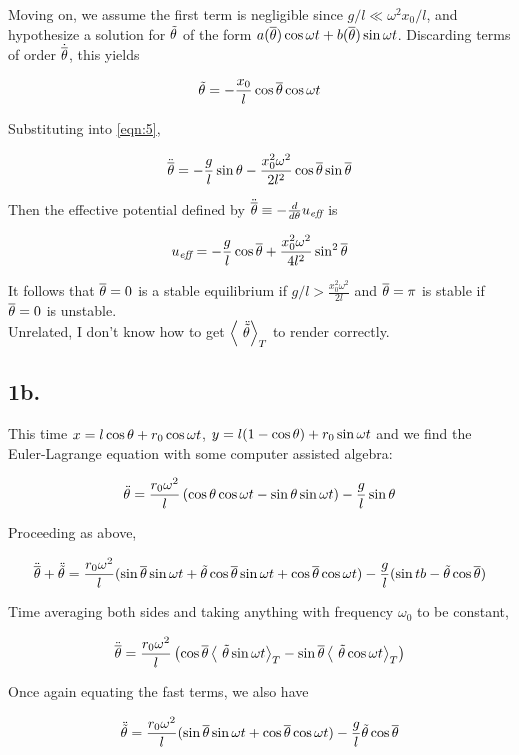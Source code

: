 \documentclass[12pt]{article}
\begin{document}
Moving on, we assume the first term is negligible since \(g/l \ll \omega^2x_0/l\), and hypothesize a solution for \(\tilde{\theta}\) of the form \(a(\overline{\theta})\cos\omega t + b(\overline{\theta})\sin\omega t\). Discarding terms of order \(\dot{\overline{\theta}}\), this yields

\[\tilde{\theta} = -\frac{x_0}{l}\cos\overline{\theta} \cos\omega t
\]

Substituting into \ref{eqn:5},

\begin{align*}
\ddot{\overline{\theta}} = -\frac{g}{l}\sin\theta - \frac{x_0^2\omega^2}{2l^2}\cos\overline{\theta}\sin\overline{\theta}
\end{align*}

Then the effective potential defined by \(\ddot{\overline{\theta}} \equiv -\frac{d}{d\theta}u_{\textit{eff}} \) is

\[u_{\textit{eff}} = -\frac{g}{l}\cos\overline{\theta} + \frac{x_0^2 \omega^2}{4l^2}\sin^2 \overline{\theta}
\]

It follows that \(\overline{\theta} = 0\) is a stable equilibrium if \(g/l > \frac{x_0^2\omega^2}{2l}\) and \(\overline{\theta}=\pi\) is stable if \(\overline{\theta}=0\) is unstable.
\\

Unrelated, I don't know how to get \(\left\langle\ \ddot{\tilde{\theta}} \right\rangle_T\) to render correctly.

\subsection*{1b.}

This time \(x = l\cos\theta + r_0\cos\omega t\), \(y = l(1-\cos\theta) + r_0\sin\omega t \) and we find the Euler-Lagrange equation with some computer assisted algebra:

\begin{align*}\ddot{\theta} &= \frac{r_0\omega^2}{l}\left(  \cos\theta \cos\omega t - \sin\theta \sin\omega t  \right) - \frac{g}{l}\sin\theta \\
\end{align*}

Proceeding as above, 

\[\ddot{\overline{\theta}} + \ddot{\tilde{\theta}} = \frac{r_0\omega^2}{l}(\sin\overline{\theta}\sin\omega t + \tilde{\theta}\cos\overline{\theta}\sin\omega t + \cos\overline{\theta}\cos\omega t ) - \frac{g}{l}(\sin\\tb - \tilde{\theta}\cos\overline{\theta})
\]

Time averaging both sides and taking anything with frequency \(\omega_0\) to be constant,

\[\ddot{\overline{\theta}} = \frac{r_0\omega^2}{l}\left(\cos\overline{\theta}\left\langle\ \tilde{\theta}\sin\omega t \right\rangle_T-\sin\overline{\theta}\left\langle\ \tilde{\theta}\cos\omega t \right\rangle_T\right)
\]

Once again equating the fast terms, we also have

\[\ddot{\tilde{\theta}}=\frac{r_0\omega^2}{l}(\sin\overline{\theta}\sin\omega t + \cos\overline{\theta}\cos\omega t) - \frac{g}{l}\tilde{\theta}\cos\overline{\theta}
\]
\end{document}
